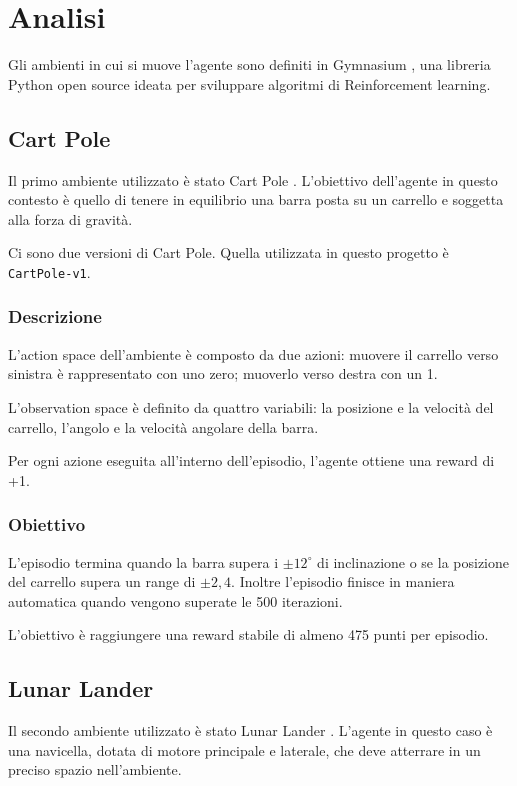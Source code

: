 \chapter{Analisi}
Gli ambienti in cui si muove l'agente sono definiti in Gymnasium \cite{gym}, una libreria Python open source ideata per sviluppare algoritmi di Reinforcement learning.

\section{Cart Pole}
\label{sec:cartpole}
Il primo ambiente utilizzato è stato Cart Pole \cite{cartpole}. L'obiettivo dell'agente in questo contesto è quello di tenere in equilibrio una barra posta su un carrello e soggetta alla forza di gravità.

Ci sono due versioni di Cart Pole. Quella utilizzata in questo progetto è \texttt{CartPole-v1}.

\subsection{Descrizione}
L'action space dell'ambiente è composto da due azioni: muovere il carrello verso sinistra è rappresentato con uno zero; muoverlo verso destra con un 1.

L'observation space è definito da quattro variabili: la posizione e la velocità del carrello, l'angolo e la velocità angolare della barra.

Per ogni azione eseguita all'interno dell'episodio, l'agente ottiene una reward di +1.

\subsection{Obiettivo}
L'episodio termina quando la barra supera i $\pm12^\circ$ di inclinazione o se la posizione del carrello supera un range di $\pm2{,}4$. Inoltre l'episodio finisce in maniera automatica quando vengono superate le 500 iterazioni.

L'obiettivo è raggiungere una reward stabile di almeno 475 punti per episodio.

\section{Lunar Lander}
\label{sec:lunalander}
Il secondo ambiente utilizzato è stato Lunar Lander \cite{lunarlander}. L'agente in questo caso è una navicella, dotata di motore principale e laterale, che deve atterrare in un preciso spazio nell'ambiente.

